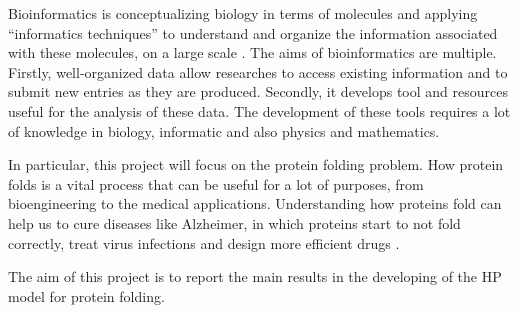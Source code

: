 Bioinformatics is conceptualizing biology in terms of molecules and applying ``informatics techniques'' to understand and organize the information associated with these molecules, on a large scale \cite{bioinfo}.
The aims of bioinformatics are multiple.
Firstly, well-organized data allow researches to access existing information and to submit new entries as they are produced.
Secondly, it develops tool and resources useful for the analysis of these data.
The development of these tools requires a lot of knowledge in biology, informatic and also physics and mathematics.

In particular, this project will focus on the protein folding problem.
How protein folds is a vital process that can be useful for a lot of purposes, from bioengineering to the medical applications.
Understanding how proteins fold can help us to cure diseases like Alzheimer, in which proteins start to not fold correctly, treat virus infections and design more efficient drugs \cite{PERM}. 

The aim of this project is to report the main results in the developing of the HP model for protein folding.
